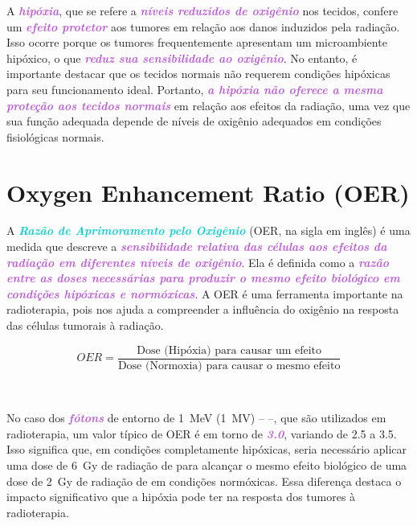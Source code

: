 \documentclass[11pt,a4paper]{article}
\begin{document}
	A \textcolor{MediumOrchid}{\textbf{\textit{hipóxia}}}, que se refere a \textcolor{MediumOrchid}{\textbf{\textit{níveis reduzidos de oxigênio}}} nos tecidos, confere um \textcolor{MediumOrchid}{\textbf{\textit{efeito protetor}}} aos tumores em relação aos danos induzidos pela radiação. Isso ocorre porque os tumores frequentemente apresentam um microambiente hipóxico, o que \textcolor{MediumOrchid}{\textbf{\textit{reduz sua sensibilidade ao oxigênio}}}. No entanto, é importante destacar que os tecidos normais não requerem condições hipóxicas para seu funcionamento ideal. Portanto, \textcolor{MediumOrchid}{\textbf{\textit{a hipóxia não oferece a mesma proteção aos tecidos normais}}} em relação aos efeitos da radiação, uma vez que sua função adequada depende de níveis de oxigênio adequados em condições fisiológicas normais.

\section{Oxygen Enhancement Ratio (OER)}

	A \textcolor{DarkTurquoise}{\textbf{\textit{Razão de Aprimoramento pelo Oxigênio}}} (OER, na sigla em inglês) é uma medida que descreve a \textcolor{MediumOrchid}{\textbf{\textit{sensibilidade relativa das células aos efeitos da radiação em diferentes níveis de oxigênio}}}. Ela é definida como a \textcolor{MediumOrchid}{\textbf{\textit{razão entre as doses necessárias para produzir o mesmo efeito biológico em condições hipóxicas e normóxicas}}}. A OER é uma ferramenta importante na radioterapia, pois nos ajuda a compreender a influência do oxigênio na resposta das células tumorais à radiação.

	\begin{equation}
		OER = \frac{\text{Dose (Hipóxia) para causar um efeito}}{\text{Dose (Normoxia) para causar o mesmo efeito}}
	\end{equation}

	\

	No caso dos \textcolor{MediumOrchid}{\textbf{\textit{fótons}}} de entorno de \SI{1}{\mega\electronvolt} (\SI{1}{\mega\volt}) --  --, que são utilizados em radioterapia, um valor típico de OER é em torno de \textcolor{MediumOrchid}{\textbf{\textit{3.0}}}, variando de 2.5 a 3.5. Isso significa que, em condições completamente hipóxicas, seria necessário aplicar uma dose de \SI{6}{\gray} de radiação de  para alcançar o mesmo efeito biológico de uma dose de \SI{2}{\gray} de radiação de  em condições normóxicas. Essa diferença destaca o impacto significativo que a hipóxia pode ter na resposta dos tumores à radioterapia.
\end{document}
